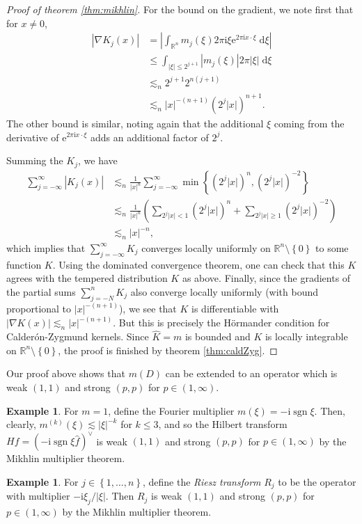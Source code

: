 \documentclass{book}
\newcommand{\bbR}{\mathbb{R}}
\renewcommand{\d}{\mathrm{d}}
\newcommand{\e}{\mathrm{e}}
\renewcommand{\i}{\mathrm{i}}
\newcommand{\abs}[1]{\left\lvert {#1} \right\rvert}
\newcommand{\set}[1]{\left\{ {#1} \right\}}
\newcommand{\parens}[1]{\left( {#1} \right)}
\DeclareMathOperator{\sgn}{sgn}
\theoremstyle{definition}
\newtheorem{example}[theorem]{Example}
\theoremstyle{remark}
\numberwithin{equation}{chapter}
\begin{document}
\begin{proof}[Proof of theorem \ref{thm:mikhlin}]
    For the bound on the gradient, we note first that for $x \neq 0$,
    \begin{equation} \begin{aligned}
        \abs{\nabla K_j(x)}
        &= \abs{ \int_{\bbR^n} m_j(\xi) 2\pi\i\xi \e^{2\pi\i x \cdot \xi} \; \d{\xi} } \\
        &\leq \int_{\abs{\xi} \leq 2^{j+1}} \abs{m_j(\xi)} 2\pi \abs{\xi} \; \d{\xi} \\
        &\lesssim_n 2^{j+1} 2^{n(j+1)} \\
        &\lesssim_n \abs{x}^{-(n+1)} (2^j \abs{x})^{n+1}.
    \end{aligned} \end{equation}
    The other bound is similar, noting again that the additional $\xi$ coming from the derivative of $\e^{2\pi\i x \cdot \xi}$ adds an additional factor of $2^j$.

    Summing the $K_j$, we have 
    \begin{equation} \begin{aligned}
        \sum_{j = -\infty}^\infty \abs{K_j(x)}
        &\lesssim_n \frac{1}{\abs{x}^n} \sum_{j=-\infty}^\infty \min\set{ (2^j\abs{x})^n, (2^j\abs{x})^{-2} } \\
        &\lesssim_n \frac{1}{\abs{x}^n} \parens{ \sum_{2^j\abs{x} < 1} (2^j\abs{x})^n + \sum_{2^j\abs{x} \geq 1} (2^j\abs{x})^{-2} } \\
        &\lesssim_n \abs{x}^{-n},
    \end{aligned} \end{equation}
    which implies that $\sum_{j=-\infty}^\infty K_j$ converges locally uniformly on $\bbR^n \setminus \set{0}$ to some function $K$. Using the dominated convergence theorem, one can check that this $K$ agrees with the tempered distribution $K$ as above. Finally, since the gradients of the partial sums $\sum_{j=-N}^n K_j$ also converge locally uniformly (with bound proportional to $\abs{x}^{-(n+1)}$), we see that $K$ is differentiable with $\abs{\nabla K(x)} \lesssim_n \abs{x}^{-(n+1)}$. But this is precisely the H\"ormander condition for Calder\'on-Zygmund kernels. Since $\widehat{K} = m$ is bounded and $K$ is locally integrable on $\bbR^n \setminus \set{0}$, the proof is finished by theorem \ref{thm:caldZyg}.
\end{proof}
Our proof above shows that $m(D)$ can be extended to an operator which is weak $(1,1)$ and strong $(p,p)$ for $p \in (1,\infty)$.

\begin{example}
    For $m = 1$, define the Fourier multiplier $m(\xi) = -\i \sgn{\xi}$. Then, clearly, $m^{(k)}(\xi) \lesssim \abs{\xi}^{-k}$ for $k \leq 3$, and so the Hilbert transform $Hf = (-\i\sgn{\xi} \widehat{f})^\vee$ is weak $(1,1)$ and strong $(p,p)$ for $p \in (1,\infty)$ by the Mikhlin multiplier theorem.
\end{example}
\begin{example}
    For $j \in \set{1,\dots,n}$, define the \textit{Riesz transform} $R_j$ to be the operator with multiplier $-\i\xi_j / \abs{\xi}$. Then $R_j$ is weak $(1,1)$ and strong $(p,p)$ for $p \in (1,\infty)$ by the Mikhlin multiplier theorem.
\end{example}
\end{document}
